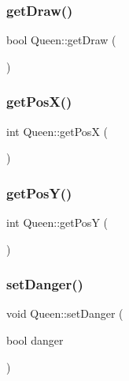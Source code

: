\subsubsection{\texorpdfstring{get\+Draw()}{getDraw()}}
{\footnotesize\ttfamily bool Queen\+::get\+Draw (\begin{DoxyParamCaption}{ }\end{DoxyParamCaption})}

\mbox{\label{class_queen_a000bf9dae46cd34eaea3608bbfab7130}} 
\subsubsection{\texorpdfstring{get\+Pos\+X()}{getPosX()}}
{\footnotesize\ttfamily int Queen\+::get\+PosX (\begin{DoxyParamCaption}{ }\end{DoxyParamCaption})}

\mbox{\label{class_queen_a0f33ea365d6214d0ca2a34ea67a7fc80}} 
\subsubsection{\texorpdfstring{get\+Pos\+Y()}{getPosY()}}
{\footnotesize\ttfamily int Queen\+::get\+PosY (\begin{DoxyParamCaption}{ }\end{DoxyParamCaption})}

\mbox{\label{class_queen_ab6b3a2e1d8ddca374d01316072386221}} 
\subsubsection{\texorpdfstring{set\+Danger()}{setDanger()}}
{\footnotesize\ttfamily void Queen\+::set\+Danger (\begin{DoxyParamCaption}\item[{bool}]{danger }\end{DoxyParamCaption})}

\mbox{\label{class_queen_af707a14b880892d79f327ac3718d06bf}} 
